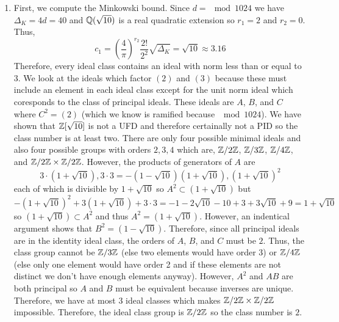 \documentclass[12pt]{extarticle}
\begin{document}
\begin{enumerate}
\begin{enumerate}
\item First, we compute the Minkowski bound. Since $d = \mod{10}{2}{4}$ we have $\Delta_K = 4 d = 40$ and $\mathbb{Q}(\sqrt{10})$ is a real quadratic extension so $r_1 = 2$ and $r_2 = 0$. Thus,
\[ c_1 = \left(\frac{4}{\pi}\right)^{r_2} \frac{2!}{2^2} \sqrt{\Delta_K} = \sqrt{10} \approx 3.16\]
Therefore, every ideal class contains an ideal with norm less than or equal to $3$. We look at the ideals which factor $(2)$ and $(3)$ because these must include an element in each ideal class except for the unit norm ideal which coresponds to the class of principal ideals. These ideals are $A$, $B$, and $C$ where $C^2 = (2)$ (which we know is ramified because $\mod{10}{2}{4}$). We have shown that $\mathbb{Z}[\sqrt{10}]$ is not a UFD and therefore certainally not a PID so the class number is at least two. There are only four possible minimal ideals and also four possible groups with orders $2,3,4$ which are, $\mathbb{Z}/2\mathbb{Z}$, $\mathbb{Z}/3\mathbb{Z}$, $\mathbb{Z}/4\mathbb{Z}$, and $\mathbb{Z}/2\mathbb{Z} \times \mathbb{Z}/2\mathbb{Z}$. However, the products of generators of $A$ are \[3 \cdot (1 + \sqrt{10}), 3 \cdot 3 = -(1 - \sqrt{10})(1 + \sqrt{10}), (1 + \sqrt{10})^2\]
each of which is divisible by $1 + \sqrt{10}$ so $A^2 \subset (1 + \sqrt{10})$ but 
\[ -(1 + \sqrt{10})^2 + 3 (1 + \sqrt{10}) + 3 \cdot 3 = -1 - 2\sqrt{10} - 10 + 3 + 3 \sqrt{10} + 9 = 1 + \sqrt{10}\]
so $(1 + \sqrt{10}) \subset A^2$ and thus $A^2 = (1 + \sqrt{10})$. However, an indentical argument shows that $B^2 = (1 - \sqrt{10})$. Therefore, since all principal ideals are in the identity ideal class, the orders of $A$, $B$, and $C$ must be $2$. Thus, the class group cannot be $\mathbb{Z}/3\mathbb{Z}$ (else two elements would have order 3) or $\mathbb{Z}/4\mathbb{Z}$ (else only one element would have order 2 and if these elements are not distinct we don't have enough elements anyway). However, $A^2$ and $AB$ are both principal so $A$ and $B$ must be equivalent because inverses are unique. Therefore, we have at most $3$ ideal classes which makes $\mathbb{Z}/2\mathbb{Z} \times \mathbb{Z}/2\mathbb{Z}$ impossible. Therefore, the ideal class group is $\mathbb{Z}/2\mathbb{Z}$ so the class number is $2$.        

 
\end{enumerate}


\end{enumerate}
\end{document}

